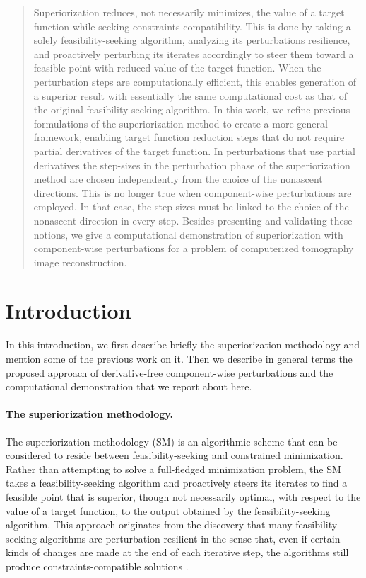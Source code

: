 \documentclass[smallextended]{svjour3}      %
\begin{document}
\begin{abstract}
Superiorization reduces, not necessarily minimizes, the value of a target function while seeking constraints-compatibility. This is done by taking a solely feasibility-seeking algorithm, analyzing its perturbations resilience, and proactively perturbing its iterates accordingly to steer them toward a feasible point with reduced value of the target function. When the perturbation steps are computationally efficient, this enables generation of a superior result with essentially the same computational cost as that of the original feasibility-seeking algorithm. In this work, we refine previous formulations of the superiorization method to create a more general framework, enabling target function reduction steps that do not require partial derivatives of the target function. In perturbations that use partial derivatives the step-sizes in the perturbation phase of the superiorization method are chosen independently from the choice of the nonascent directions. This is no longer true when component-wise perturbations are employed. In that case, the step-sizes must be linked to the choice of the nonascent direction in every step. Besides presenting and validating these notions, we give a computational demonstration of superiorization with component-wise perturbations for a problem of computerized tomography image reconstruction.

\end{abstract}

\section{Introduction}
\label{intro}
In this introduction, we first describe briefly the superiorization methodology and mention some of the previous work on it. Then we describe in general terms the proposed approach of derivative-free component-wise perturbations and the computational demonstration that we report about here.
\paragraph{\textbf{The superiorization methodology}.}
The superiorization methodology (SM) is an algorithmic scheme that can be considered to reside between feasibility-seeking and constrained minimization. Rather than attempting to solve a full-fledged minimization problem, the SM takes a feasibility-seeking algorithm and proactively steers its iterates to find a feasible point that is superior, though not necessarily optimal, with respect to the value of a target function, to the output obtained by the feasibility-seeking algorithm. This approach originates from the discovery that many feasibility-seeking algorithms are perturbation resilient in the sense that, even if certain kinds of changes are made at the end of each iterative step, the algorithms still produce constraints-compatible solutions \cite{butnariu2007stable,censor2010perturbation,davidi2009perturbation,nikazad2012accelerated}.
\end{document}
